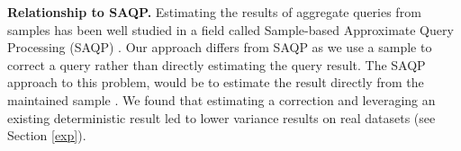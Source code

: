 {\noindent \bf Relationship to SAQP.}
Estimating the results of aggregate queries from samples has been
well studied in a field called Sample-based Approximate Query Processing
(SAQP) \cite{OlkenR86,AgarwalMPMMS13}.
Our approach differs from SAQP as we use a sample to correct a query rather than directly estimating the query result.
The SAQP approach to this problem, would be to
estimate the result directly from the maintained sample \cite{joshi2008materialized}.
We found that estimating
a correction and leveraging an existing deterministic result led
to lower variance results on real datasets (see Section \ref{exp}). 


